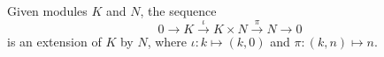 Given modules $K$ and $N$, the sequence
$$0 \rightarrow K \xrightarrow{\iota} K \times N \xrightarrow{\pi} N \rightarrow 0$$
is an extension of $K$ by $N$, where $\iota: k \mapsto (k, 0)$ and $\pi: (k, n) \mapsto n$.
